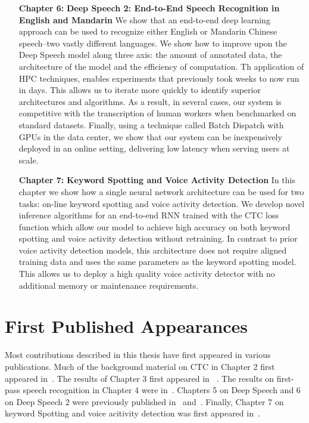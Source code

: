 \begin{itemize}
    \item [{\bf Chapter 6:}]{\bf Deep Speech 2: End-to-End Speech Recognition
        in English and Mandarin} We show that an end-to-end deep learning
        approach can be used to recognize either English or Mandarin Chinese
        speech–two vastly different languages. We show how to improve upon the
        Deep Speech model along three axis: the amount of annotated data, the
        architecture of the model and the efficiency of computation.  Th
        application of HPC techniques, enables experiments that previously took
        weeks to now run in days. This allows us to iterate more quickly to
        identify superior architectures and algorithms.  As a result, in
        several cases, our system is competitive with the transcription of
        human workers when benchmarked on standard datasets.  Finally, using a
        technique called Batch Dispatch with GPUs in the data center, we show
        that our system can be inexpensively deployed in an online setting,
        delivering low latency when serving users at scale.

    \item [{\bf Chapter 7:}]{\bf Keyword Spotting and Voice Activity Detection}
        In this chapter we show how a single neural network architecture can be
        used for two tasks: on-line keyword spotting and voice activity
        detection. We develop novel inference algorithms for an end-to-end RNN
        trained with the CTC loss function which allow our model to achieve
        high accuracy on both keyword spotting and voice activity detection
        without retraining. In contrast to prior voice activity detection
        models, this architecture does not require aligned training data and
        uses the same parameters as the keyword spotting model. This allows us
        to deploy a high quality voice activity detector with no additional
        memory or maintenance requirements.

\end{itemize}

\section{First Published Appearances}
Most contributions described in this thesis have first appeared in various
publications. Much of the background material on CTC in Chapter 2 first
appeared in~\cite{rajpurkar2017}. The results of Chapter 3 first appeared in
~\cite{hannun2017sequence}. The results on first-pass speech recognition in
Chapter 4 were in~\cite{hannun2014firstpass}. Chapters 5 on Deep Speech and 6
on Deep Speech 2 were previously published in~\cite{hannun2014deepspeech}
and~\cite{amodei2016deep}. Finally, Chapter 7 on keyword Spotting and voice
acitivity detection was first appeared in~\cite{lengerich2016}.
